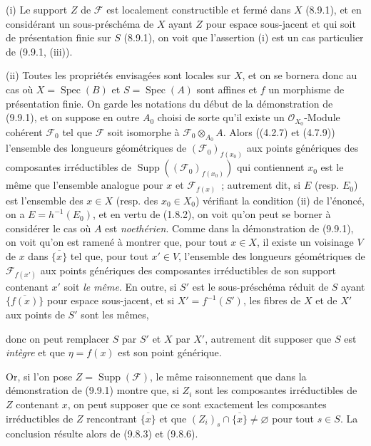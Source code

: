 (i) Le support $Z$ de $\mathcal F$ est localement constructible et fermé dans
$X$ (8.9.1), et en considérant un sous-préschéma de $X$ ayant $Z$ pour espace
sous-jacent et qui soit de présentation finie sur $S$ (8.9.1), on voit que
l'assertion (i) est un cas particulier de (9.9.1, (iii)).

(ii) Toutes les propriétés envisagées sont locales sur $X$, et on se bornera
donc au cas où $X=\operatorname{Spec}(B)$ et $S=\operatorname{Spec}(A)$ sont
affines et $f$ un morphisme de présentation finie. On garde les notations du
début de la démonstration de (9.9.1), et on suppose en outre $A_0$ choisi de
sorte qu'il existe un $\mathcal O_{X_0}$-Module cohérent $\mathcal F_0$ tel que
$\mathcal F$ soit isomorphe à $\mathcal F_0\otimes_{A_0}A$. Alors ((4.2.7) et
(4.7.9)) l'ensemble des longueurs géométriques de
$(\mathcal F_0)_{f(x_0)}$ aux points génériques des composantes irréductibles de
$\operatorname{Supp}((\mathcal F_0)_{f(x_0)})$ qui contiennent $x_0$ est le
même que l'ensemble analogue pour $x$ et $\mathcal F_{f(x)}$~; autrement dit,
si $E$ (resp. $E_0$) est l'ensemble des $x\in X$ (resp. des $x_0\in X_0$)
vérifiant la condition (ii) de l'énoncé, on a $E=h^{-1}(E_0)$, et en vertu de
(1.8.2), on voit qu'on peut se borner à considérer le cas où $A$ est
\emph{noethérien}. Comme dans la démonstration de (9.9.1), on voit qu'on est
ramené à montrer que, pour tout $x\in X$, il existe un voisinage $V$ de $x$
dans $\overline{\{x\}}$ tel que, pour tout $x'\in V$, l'ensemble des longueurs
géométriques de $\mathcal F_{f(x')}$ aux points génériques des composantes
irréductibles de son support contenant $x'$ soit \emph{le même}. En outre, si
$S'$ est le sous-préschéma réduit de $S$ ayant $\overline{\{f(x)\}}$ pour espace
sous-jacent, et si $X'=f^{-1}(S')$, les fibres de $X$ et de $X'$ aux points de
$S'$ sont les mêmes,


donc on peut remplacer $S$ par $S'$ et $X$ par $X'$, autrement dit supposer que
$S$ est \emph{intègre} et que $\eta=f(x)$ est son point générique.

Or, si l'on pose $Z=\operatorname{Supp}(\mathcal F)$, le même raisonnement que
dans la démonstration de (9.9.1) montre que, si $Z_i$ sont les composantes
irréductibles de $Z$ contenant $x$, on peut supposer que ce sont exactement les
composantes irréductibles de $Z$ rencontrant $\overline{\{x\}}$ et que
$(Z_i)_s\cap\overline{\{x\}}\neq\varnothing$ pour tout $s\in S$. La conclusion
résulte alors de (9.8.3) et (9.8.6).

